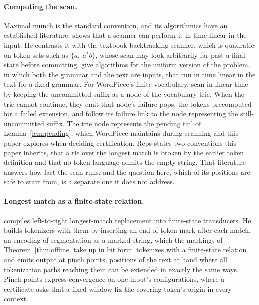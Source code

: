 \documentclass[11pt,a4paper]{article}
\theoremstyle{definition}
\theoremstyle{plain}
\begin{document}
\paragraph{Computing the scan.} Maximal munch is the standard convention, and its algorithmics have an established
literature. \citet{reps1998maximal} shows that a scanner can perform it in time linear in the input. He contrasts it
with the textbook backtracking scanner, which is quadratic on token sets such as $\{a,\ a^{*}b\}$, whose scan may look
arbitrarily far past a final state before committing. \citet{li2025uniform} give algorithms for the uniform version of
the problem, in which both the grammar and the text are inputs, that run in time linear in the text for a fixed grammar.
For WordPiece's finite vocabulary, \citet{song2021wordpiece} scan in linear time by keeping the uncommitted suffix as a
node of the vocabulary trie. When the trie cannot continue, they emit that node's failure pops, the tokens precomputed
for a failed extension, and follow its failure link to the node representing the still-uncommitted suffix. The trie node
represents the pending tail of Lemma~\ref{lem:pending}, which WordPiece maintains during scanning and this paper
explores when deciding certification. Reps states two conventions this paper inherits, that a tie over the longest match
is broken by the earlier token definition and that no token language admits the empty string. That literature answers
how fast the scan runs, and the question here, which of its positions are safe to start from, is a separate one it does
not address.

\paragraph{Longest match as a finite-state relation.} \citet{karttunen1996directed} compiles left-to-right longest-match
replacement into finite-state transducers. He builds tokenizers with them by inserting an end-of-token mark after each
match, an encoding of segmentation as a marked string, which the markings of Theorem~\ref{thm:offline} take up in bit
form. \citet{kaplan1998tokenizing,kaplan2005tokenizing} tokenizes with a finite-state relation and emits output at pinch
points, positions of the text at hand where all tokenization paths reaching them can be extended in exactly the same
ways. Pinch points express convergence on one input's configurations, where a certificate asks that a fixed window fix
the covering token's origin in every context.
\end{document}
